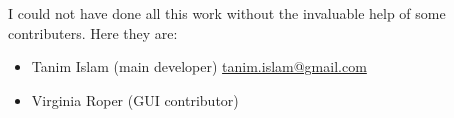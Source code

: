 \documentclass[12pt, fleqn]{article}
\begin{document}
I could not have done all this work without the invaluable help of
some contributers. Here they are:
\begin{itemize}
  \item Tanim Islam (main developer)
    \href{mailto:tanim.islam@gmail.com}{tanim.islam@gmail.com}
    
  \item Virginia Roper (GUI contributor)
  
\end{itemize}
\end{document}
